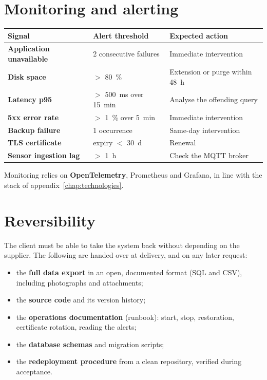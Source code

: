 \section{Monitoring and alerting}
\begin{xltabular}{\textwidth}{>{\bfseries}p{4.2cm} p{3.4cm} X}
\toprule
\textbf{Signal} & \textbf{Alert threshold} & \textbf{Expected action} \\
\midrule
\endhead
Application unavailable & 2 consecutive failures & Immediate intervention \\
Disk space & $>$ 80~\% & Extension or purge within 48~h \\
Latency p95 & $>$ 500~ms over 15~min & Analyse the offending query \\
5xx error rate & $>$ 1~\% over 5~min & Immediate intervention \\
Backup failure & 1 occurrence & Same-day intervention \\
TLS certificate & expiry $<$ 30~d & Renewal \\
Sensor ingestion lag & $>$ 1~h & Check the MQTT broker \\
\bottomrule
\end{xltabular}

Monitoring relies on \textbf{OpenTelemetry}, Prometheus and Grafana, in line
with the stack of appendix~\ref{chap:technologies}.

\section{Reversibility}
The client must be able to take the system back without depending on the
supplier. The following are handed over at delivery, and on any later request:

\begin{itemize}
  \item the \textbf{full data export} in an open, documented format (SQL and
        CSV), including photographs and attachments;
  \item the \textbf{source code} and its version history;
  \item the \textbf{operations documentation} (runbook): start, stop,
        restoration, certificate rotation, reading the alerts;
  \item the \textbf{database schemas} and migration scripts;
  \item the \textbf{redeployment procedure} from a clean repository, verified
        during acceptance.
\end{itemize}

